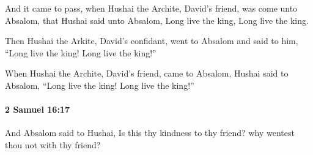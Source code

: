 			\begin{versebox}
					\item[BHS] 
					\item[ASV] And it came to pass, when Hushai the Archite, David's friend, was come unto Absalom, that Hushai said unto Absalom, Long live the king, Long live the king.
					\item[NIV] Then Hushai the Arkite, David’s confidant, went to Absalom and said to him, “Long live the king! Long live the king!”
					\item[NRSV] When Hushai the Archite, David’s friend, came to Absalom, Hushai said to Absalom, “Long live the king! Long live the king!”
			\end{versebox}

		\paragraph{2 Samuel 16:17} %
			\label{2SAMUEL-16-17}

			And Absalom said to Hushai, Is this thy kindness to thy friend? why wentest thou not with thy friend?

